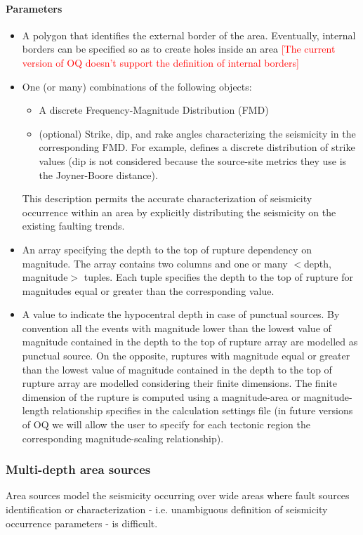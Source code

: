 \paragraph{Parameters}
\begin{itemize}
\item A polygon that identifies the external border of the area. Eventually, 
internal borders can be specified so as to create holes inside an area
	\textcolor{red}{[The current version of OQ doesn't support the definition of internal borders]}
\item One (or many) combinations of the following objects:
\begin{itemize}
	\item A discrete Frequency-Magnitude Distribution (FMD)
	\item (optional) Strike, dip, and rake angles characterizing the seismicity  in the corresponding FMD.
	For example, \cite{coppersmith2009} defines a discrete distribution of 
	strike values (dip is not considered because the source-site metrics they 
	use is the Joyner-Boore distance). 
\end{itemize}
This description permits the accurate characterization of seismicity occurrence 
within an area by explicitly distributing the seismicity on the existing 
faulting trends. 
\item An array specifying the depth to the top of rupture dependency on 
magnitude. The array contains two columns and one or many $<$depth, magnitude$>$ 
tuples. Each tuple specifies the depth to the top of rupture for magnitudes 
equal or greater than the corresponding value. 
\item A value to indicate the hypocentral depth in case of punctual sources. 
By convention all the events with magnitude lower than the lowest value of 
magnitude contained in the depth to the top of rupture array are modelled as 
punctual source. On the opposite, ruptures with magnitude equal or greater than 
the lowest value of magnitude contained in the depth to the top of rupture array 
are modelled considering their finite dimensions. The finite dimension of the 
rupture is computed using a magnitude-area or magnitude-length relationship 
specifies in the calculation settings file (in future versions of OQ we will 
allow the user to specify for each tectonic region the corresponding 
magnitude-scaling relationship).
\end{itemize}
%
\subsubsection{Multi-depth area sources}
\label{hazard:seismic_source_types:multiDepthAreaSources}
Area sources model the seismicity occurring over wide areas where fault 
sources identification or characterization - i.e. unambiguous definition 
of seismicity occurrence parameters - is difficult. 


